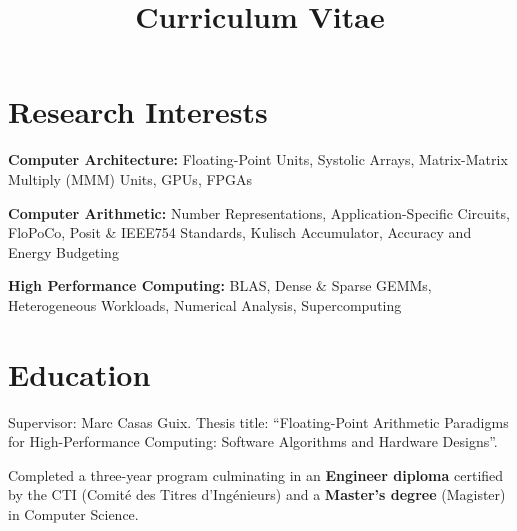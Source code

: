 \documentclass[11pt,a4paper]{moderncv}
\title{Curriculum Vitae}
\begin{document}
\makecvtitle


\section{Research Interests}

\textbf{Computer Architecture:} Floating-Point Units, Systolic Arrays, Matrix-Matrix Multiply (MMM) Units, GPUs, FPGAs

\textbf{Computer Arithmetic:} Number Representations, Application-Specific Circuits, FloPoCo, Posit \& IEEE754 Standards, Kulisch Accumulator, Accuracy and Energy Budgeting

\textbf{High Performance Computing:} BLAS, Dense \& Sparse GEMMs, Heterogeneous Workloads, Numerical Analysis, Supercomputing


\section{Education}
{
Supervisor: Marc Casas Guix. Thesis title: ``Floating-Point Arithmetic Paradigms for High-Performance Computing: Software Algorithms and Hardware Designs''.
}

{
    Completed a three-year program culminating in an \textbf{Engineer diploma} certified by the CTI (Comité des Titres d'Ingénieurs) and a \textbf{Master's degree} (Magister) in Computer Science.
}
\end{document}
